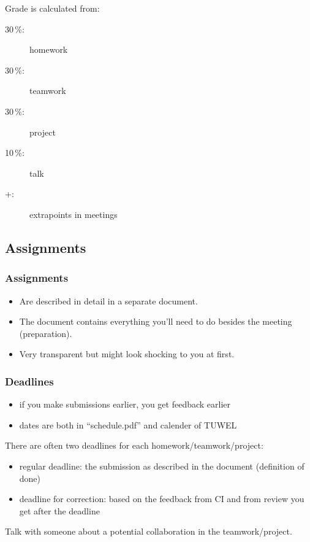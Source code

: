 \begin{frame}
	Grade is calculated from:
	\begin{description}
	\item[30\,\%:] homework
	\item[30\,\%:] teamwork
	\item[30\,\%:] project
	\item[10\,\%:] talk
	\item[+:] extrapoints in meetings
	\end{description}
\end{frame}

\subsection{Assignments}
\begin{frame}
	\frametitle{Assignments}
	\begin{itemize}
		\item Are described in detail in a separate document.
		\item The document contains everything you'll need to do besides the meeting (preparation).
		\item Very transparent but might look shocking to you at first.
	\end{itemize}
\end{frame}

\begin{frame}
	\frametitle{Deadlines}

	\begin{itemize}
	\item if you make submissions earlier, you get feedback earlier
	\item dates are both in ``schedule.pdf'' and calender of TUWEL
	\end{itemize}

	There are often two deadlines for each homework/teamwork/project:

	\begin{itemize}
	\item regular deadline: the submission as described in the document (definition of done)
	\item deadline for correction: based on the feedback from CI and from review you get after the deadline
	\end{itemize}
\end{frame}

\begin{assignment}
	\begin{task}
	Talk with someone about a potential collaboration in the teamwork/project.
	\end{task}
\end{assignment}

